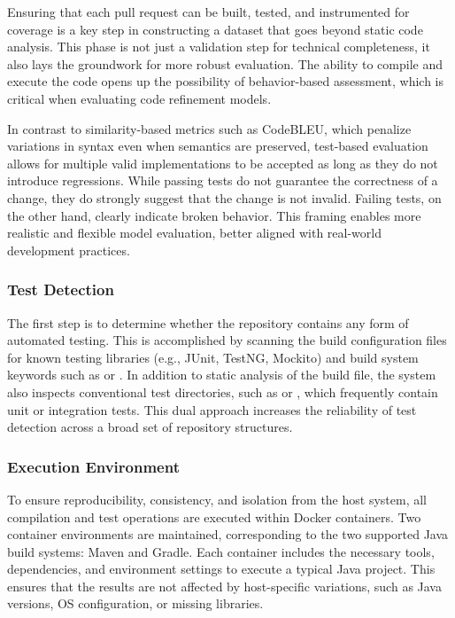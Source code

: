 Ensuring that each pull request can be built, tested, and instrumented for coverage is a key step in
constructing a dataset that goes beyond static code analysis. This phase is not just a validation
step for technical completeness, it also lays the groundwork for more robust evaluation. The ability
to compile and execute the code opens up the possibility of behavior-based assessment, which is
critical when evaluating code refinement models.

In contrast to similarity-based metrics such as CodeBLEU, which penalize variations in syntax even
when semantics are preserved, test-based evaluation allows for multiple valid implementations to be
accepted as long as they do not introduce regressions. While passing tests do not guarantee the
correctness of a change, they do strongly suggest that the change is not invalid. Failing tests, on
the other hand, clearly indicate broken behavior. This framing enables more realistic and flexible
model evaluation, better aligned with real-world development practices.

\subsubsection{Test Detection}

The first step is to determine whether the repository contains any form of automated
testing. This is accomplished by scanning the build configuration files for known testing libraries
(e.g., JUnit, TestNG, Mockito) and build system keywords such as  or
. In addition to static analysis of the build file, the system also
inspects conventional test directories, such as  or , which
frequently contain unit or integration tests. This dual approach increases the reliability of test
detection across a broad set of repository structures.

\subsubsection{Execution Environment}
\label{sec:exec-env}

To ensure reproducibility, consistency, and isolation from the host system, all compilation and test
operations are executed within Docker containers. Two container environments are maintained,
corresponding to the two supported Java build systems: Maven and Gradle. Each container includes the
necessary tools, dependencies, and environment settings to execute a typical Java project. This
ensures that the results are not affected by host-specific variations, such as Java versions, OS
configuration, or missing libraries.

